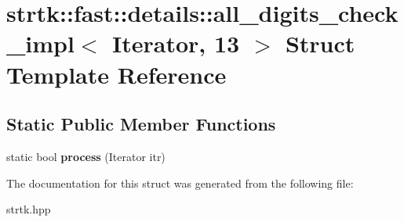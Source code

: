 \hypertarget{structstrtk_1_1fast_1_1details_1_1all__digits__check__impl_3_01Iterator_00_0113_01_4}{\section{strtk\-:\-:fast\-:\-:details\-:\-:all\-\_\-digits\-\_\-check\-\_\-impl$<$ Iterator, 13 $>$ Struct Template Reference}
\label{structstrtk_1_1fast_1_1details_1_1all__digits__check__impl_3_01Iterator_00_0113_01_4}
}
\subsection*{Static Public Member Functions}
\begin{DoxyCompactItemize}
\item 
\hypertarget{structstrtk_1_1fast_1_1details_1_1all__digits__check__impl_3_01Iterator_00_0113_01_4_aa96bee47011ea8b6ec8bf0f3905eed1f}{static bool {\bfseries process} (Iterator itr)}\label{structstrtk_1_1fast_1_1details_1_1all__digits__check__impl_3_01Iterator_00_0113_01_4_aa96bee47011ea8b6ec8bf0f3905eed1f}

\end{DoxyCompactItemize}


The documentation for this struct was generated from the following file\-:\begin{DoxyCompactItemize}
\item 
strtk.\-hpp\end{DoxyCompactItemize}
